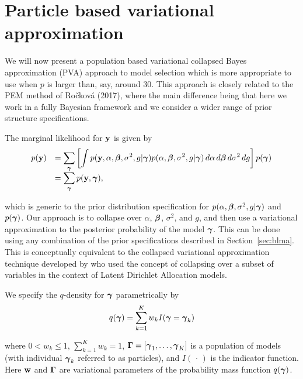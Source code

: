 \section{Particle based variational approximation}
\label{sec:pb-pva}

We will now present a population based variational collapsed Bayes
approximation (PVA) approach to model selection which is more appropriate to
use when $p$ is larger than, say, around $30$. This approach is closely related
to the PEM  method of Ro\v{c}kov\'{a} (2017), where the main difference being
that here we work in a fully Bayesian framework and we consider a wider range
of prior structure specifications.

The marginal likelihood for ${\bf y}$ is given by
$$
\begin{array}{rl}
\displaystyle p({\bf y}) 
& \displaystyle = \sum_{{\boldsymbol \gamma}} \left[ \int p({\bf y},\alpha,{\boldsymbol \beta},\sigma^2,g|{\boldsymbol \gamma}) p(\alpha,{\boldsymbol \beta},\sigma^2,g|{\boldsymbol \gamma}) \, d\alpha \, d{\boldsymbol \beta} \, d\sigma^2 \, dg\right] p({\boldsymbol \gamma}) 
\\
& \displaystyle = \sum_{{\boldsymbol \gamma}} p({\bf y},{\boldsymbol \gamma}),
\end{array} 
$$

\noindent which is generic to the prior distribution specification for
$p(\alpha,{\boldsymbol \beta},\sigma^2,g|{\boldsymbol \gamma})$ and $p({\boldsymbol \gamma})$. Our approach is to
collapse over $\alpha$, ${\boldsymbol \beta}$, $\sigma^2$, and $g$, and then use a
variational approximation to the posterior probability of the model ${\boldsymbol \gamma}$.
This can be done using any combination of the prior specifications described in
Section~\ref{sec:blma}. This is conceptually equivalent to the collapsed
variational approximation technique developed by \cite{Teh2006} who used the
concept of collapsing over a subset of variables in the context of Latent
Dirichlet Allocation models.

We specify the $q$-density for ${\boldsymbol \gamma}$ parametrically by
\begin{equation}\label{eq:qgamma} 
q({\boldsymbol \gamma}) = \sum_{k=1}^K w_k I({\boldsymbol \gamma} = {\boldsymbol \gamma}_k)
\end{equation} 

\noindent where $0 < w_k \le 1$, $\sum_{k=1}^K w_k = 1$, ${\boldsymbol \Gamma} =
[{\boldsymbol \gamma}_1,\ldots,{\boldsymbol \gamma}_K]$ is a population of models (with individual
${\boldsymbol \gamma}_k$ referred to as particles), and $I(\,\cdot\,)$ is the indicator
function. Here ${\bf w}$ and ${\boldsymbol \Gamma}$ are variational parameters of the
probability mass function $q({\boldsymbol \gamma})$.

